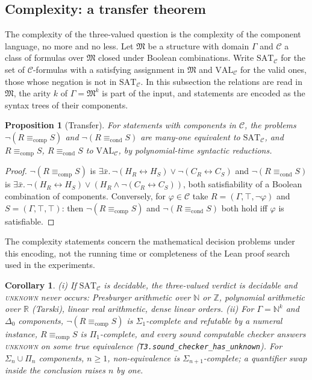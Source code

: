 \documentclass[10pt]{article}
\newtheorem{proposition}[theorem]{Proposition}
\newtheorem{corollary}[theorem]{Corollary}
\theoremstyle{definition}
\newcommand{\Econd}{\mathrel{\equiv_{\mathrm{cond}}}}
\newcommand{\Ecomp}{\mathrel{\equiv_{\mathrm{comp}}}}
\newcommand{\V}[1]{\textsc{#1}}
\begin{document}
\subsection{Complexity: a transfer theorem}\label{sec:complexity}

The complexity of the three-valued question is the complexity of the component language,
no more and no less. Let $\mathfrak M$ be a structure with domain $\Gamma$ and $\mathcal C$ a
class of formulas over $\mathfrak M$ closed under Boolean combinations. Write
$\mathrm{SAT}_{\mathcal C}$ for the set of $\mathcal C$-formulas with a satisfying assignment
in $\mathfrak M$ and $\mathrm{VAL}_{\mathcal C}$ for the valid ones, those whose negation is not
in $\mathrm{SAT}_{\mathcal C}$. In this subsection the relations are read in $\mathfrak M$, the
arity $k$ of $\Gamma=\mathfrak M^k$ is part of the input, and statements are encoded as the
syntax trees of their components.

\begin{proposition}[Transfer]\label{thm:transfer}
For statements with components in $\mathcal C$, the problems $\neg(R\Ecomp S)$ and
$\neg(R\Econd S)$ are many-one equivalent to $\mathrm{SAT}_{\mathcal C}$, and $R\Ecomp S$,
$R\Econd S$ to $\mathrm{VAL}_{\mathcal C}$, by polynomial-time syntactic reductions.
\end{proposition}
\begin{proof}
$\neg(R\Ecomp S)$ is $\exists\bar x.\,\neg(H_R\leftrightarrow H_S)\vee\neg(C_R\leftrightarrow C_S)$
and $\neg(R\Econd S)$ is $\exists\bar x.\,\neg(H_R\leftrightarrow H_S)\vee(H_R\wedge\neg(C_R\leftrightarrow C_S))$,
both satisfiability of a Boolean combination of components. Conversely, for $\varphi\in\mathcal C$
take $R=(\Gamma,\top,\neg\varphi)$ and $S=(\Gamma,\top,\top)$: then $\neg(R\Ecomp S)$ and
$\neg(R\Econd S)$ both hold iff $\varphi$ is satisfiable.
\end{proof}

The complexity statements concern the mathematical decision problems under this encoding, not
the running time or completeness of the Lean proof search used in the experiments.

\begin{corollary}\label{cor:fragments}
(i) If $\mathrm{SAT}_{\mathcal C}$ is decidable, the three-valued verdict is decidable and
\V{unknown} never occurs: Presburger arithmetic over $\mathbb N$ or $\mathbb Z$, polynomial
arithmetic over $\mathbb R$ (Tarski), linear real arithmetic, dense linear orders.
(ii) For $\Gamma=\mathbb N^k$ and $\Delta_0$ components, $\neg(R\Ecomp S)$ is
$\Sigma_1$-complete and refutable by a numeral instance, $R\Ecomp S$ is $\Pi_1$-complete, and
every sound computable checker answers \V{unknown} on some true equivalence
(\texttt{T3.sound\_checker\_has\_unknown}). For $\Sigma_n\cup\Pi_n$ components, $n\ge1$,
non-equivalence is $\Sigma_{n+1}$-complete; a quantifier swap inside the conclusion raises $n$
by one.
\end{corollary}
\end{document}
